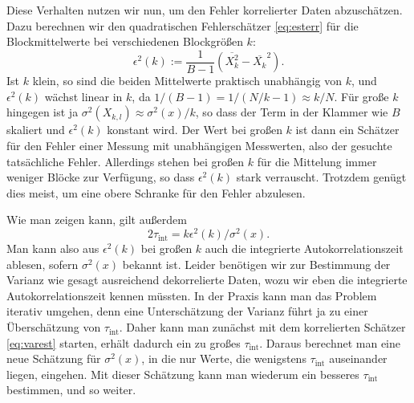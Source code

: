 Diese Verhalten nutzen wir nun, um den Fehler korrelierter Daten
abzuschätzen. Dazu berechnen wir den quadratischen Fehlerschätzer
\eqref{eq:esterr} für die Blockmittelwerte bei verschiedenen
Blockgrößen $k$:
\begin{equation}
  \epsilon^2(k) := \frac{1}{B - 1} \left(\overline{X_k^2} - \overline{X_k}^2\right).
\end{equation}
Ist $k$ klein, so sind die beiden Mittelwerte praktisch unabhängig von
$k$, und $\epsilon^2(k)$ wächst linear in $k$, da $1/(B-1) = 1/(N/k -
1)\approx k/N$. Für große $k$ hingegen ist ja $\sigma^2(X_{k,l})
\approx \sigma^2(x)/k$, so dass der Term in der Klammer wie $B$
skaliert und $\epsilon^2(k)$ konstant wird. Der Wert bei großen $k$ ist
dann ein Schätzer für den Fehler einer Messung mit unabhängigen
Messwerten, also der gesuchte tatsächliche Fehler.  Allerdings stehen
bei großen $k$ für die Mittelung immer weniger Blöcke zur Verfügung,
so dass $\epsilon^2(k)$ stark verrauscht. Trotzdem genügt dies meist, um
eine obere Schranke für den Fehler abzulesen.

Wie man zeigen kann, gilt außerdem~\cite{janke02a}
\begin{equation}
  \label{eq:tauint}
  2\tau_\text{int} = k \epsilon^2(k)/\sigma^2(x).
\end{equation}
Man kann also aus $\epsilon^2(k)$ bei großen $k$ auch die integrierte
Autokorrelationszeit ablesen, sofern $\sigma^2(x)$ bekannt ist. Leider
benötigen wir zur Bestimmung der Varianz wie gesagt ausreichend
dekorrelierte Daten, wozu wir eben die integrierte
Autokorrelationszeit kennen müssten. In der Praxis kann man das
Problem iterativ umgehen, denn eine Unterschätzung der Varianz führt
ja zu einer Überschätzung von $\tau_\text{int}$. Daher kann man
zunächst mit dem korrelierten Schätzer \eqref{eq:varest} starten,
erhält dadurch ein zu großes $\tau_\text{int}$. Daraus berechnet man
eine neue Schätzung für $\sigma^2(x)$, in die nur Werte, die
wenigstens $\tau_\text{int}$ auseinander liegen, eingehen. Mit dieser
Schätzung kann man wiederum ein besseres  $\tau_\text{int}$ bestimmen,
und so weiter.

